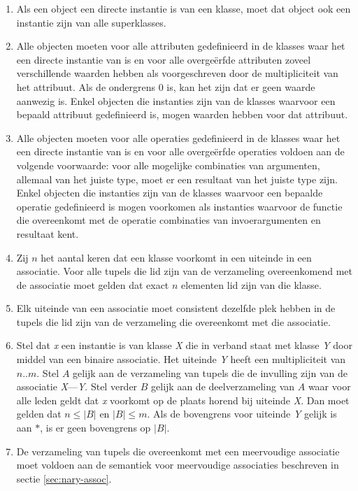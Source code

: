\begin{enumerate}
	\item Als een object een directe instantie is van een klasse, moet dat object ook een instantie zijn van alle superklasses.\label{rule:instance}
	\item Alle objecten moeten voor alle attributen gedefinieerd in de klasses waar het een directe instantie van is en voor alle overge\"erfde attributen zoveel verschillende waarden hebben als voorgeschreven door de multipliciteit van het attribuut. Als de ondergrens 0 is, kan het zijn dat er geen waarde aanwezig is. Enkel objecten die instanties zijn van de klasses waarvoor een bepaald attribuut gedefinieerd is, mogen waarden hebben voor dat attribuut.\label{rule:attr}
	\item Alle objecten moeten voor alle operaties gedefinieerd in de klasses waar het een directe instantie van is en voor alle overge\"erfde operaties voldoen aan de volgende voorwaarde: voor alle mogelijke combinaties van argumenten, allemaal van het juiste type, moet er een resultaat van het juiste type zijn. Enkel objecten die instanties zijn van de klasses waarvoor een bepaalde operatie gedefinieerd is mogen voorkomen als instanties waarvoor de functie die overeenkomt met de operatie combinaties van invoerargumenten en resultaat kent.\label{rule:op}
	\item Zij $n$ het aantal keren dat een klasse voorkomt in een uiteinde in een associatie. Voor alle tupels die lid zijn van de verzameling overeenkomend met de associatie moet gelden dat exact $n$ elementen lid zijn van die klasse.\label{rule:assoc-occ}
	\item Elk uiteinde van een associatie moet consistent dezelfde plek hebben in de tupels die lid zijn van de verzameling die overeenkomt met die associatie.\label{rule:assoc-con}
	\item Stel dat \textit{x} een instantie is van klasse \textit{X} die in verband staat met klasse \textit{Y} door middel van een binaire associatie. Het uiteinde \textit{Y} heeft een multipliciteit van $n..m$. Stel $A$ gelijk aan de verzameling van tupels die de invulling zijn van de associatie \textit{X}---\textit{Y}. Stel verder $B$ gelijk aan de deelverzameling van $A$ waar voor alle leden geldt dat \textit{x} voorkomt op de plaats horend bij uiteinde \textit{X}. Dan moet gelden dat $n \leq |B|$ en $|B| \leq m$. Als de bovengrens voor uiteinde \textit{Y} gelijk is aan $*$, is er geen bovengrens op $|B|$.\label{rule:assoc-mult}
	\item De verzameling van tupels die overeenkomt met een meervoudige associatie moet voldoen aan de semantiek voor meervoudige associaties beschreven in sectie \ref{sec:nary-assoc}.\label{rule:assoc-nary}
\end{enumerate}


